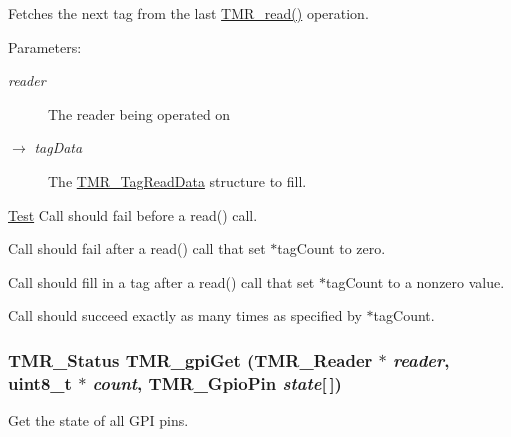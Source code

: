 Fetches the next tag from the last \hyperlink{group__reader_gb477ff41498adaa35ca5cae932ecfc70}{TMR\_\-read()} operation.

\begin{Desc}
\item[Parameters:]
\begin{description}
\item[{\em reader}]The reader being operated on \item[\mbox{$\rightarrow$} {\em tagData}]The \hyperlink{struct_t_m_r___tag_read_data}{TMR\_\-TagReadData} structure to fill.\end{description}
\end{Desc}
\begin{Desc}
\item[\hyperlink{test__test000007}{Test}]Call should fail before a read() call. 

Call should fail after a read() call that set $\ast$tagCount to zero. 

Call should fill in a tag after a read() call that set $\ast$tagCount to a nonzero value. 

Call should succeed exactly as many times as specified by $\ast$tagCount. \end{Desc}
\hypertarget{group__reader_g11ed5acc43ab75e923690e86fcaadc16}{
\subsubsection[{TMR\_\-gpiGet}]{\setlength{\rightskip}{0pt plus 5cm}TMR\_\-Status TMR\_\-gpiGet ({\bf TMR\_\-Reader} $\ast$ {\em reader}, \/  uint8\_\-t $\ast$ {\em count}, \/  {\bf TMR\_\-GpioPin} {\em state}\mbox{[}$\,$\mbox{]})}}
\label{group__reader_g11ed5acc43ab75e923690e86fcaadc16}


Get the state of all GPI pins.

